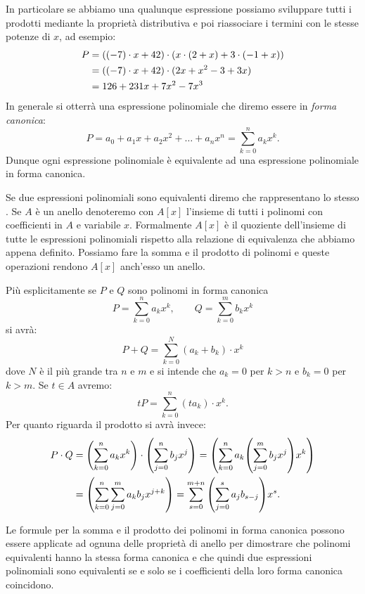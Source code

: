 In particolare se abbiamo una qualunque espressione possiamo sviluppare tutti i prodotti
mediante la proprietà distributiva e poi riassociare i termini 
con le stesse potenze di $x$, ad esempio:
\begin{align*}
P &= {\left( (-7)\cdot x+42 \right)}\cdot(x\cdot (2 + x)
+ 3\cdot(-1+x))\\
&= {\left( (-7)\cdot x + 42 \right)}\cdot (2x+x^2-3+3x) \\
&= 126 + 231 x + 7 x^2 - 7 x^3
\end{align*}
In generale si otterrà una espressione polinomiale che diremo 
essere in \emph{forma canonica}:
\[
  P = a_0 + a_1 x + a_2 x^2 + \dots + a_n x^n
       = \sum_{k=0}^n a_k x^k.
\]
Dunque ogni espressione polinomiale è equivalente ad una 
espressione polinomiale in forma canonica. 

Se due espressioni polinomiali sono equivalenti 
diremo che rappresentano lo stesso .
Se $A$ è un anello denoteremo con 
$A[x]$ \index{$\KK[x]$}%
l'insieme di tutti i polinomi con coefficienti in $A$ e variabile $x$. 
Formalmente $A[x]$ è il quoziente dell'insieme 
di tutte le espressioni polinomiali rispetto alla relazione di equivalenza
che abbiamo appena definito. 
Possiamo fare la somma e il prodotto di polinomi e queste operazioni 
rendono $A[x]$ anch'esso un anello.

Più esplicitamente se $P$ e $Q$ sono polinomi in forma canonica
\[
  P = \sum_{k=0}^n a_k x^k, \qquad Q = \sum_{k=0}^m b_k x^k
\]
si avrà:
\[
  P + Q = \sum_{k=0}^{N} (a_k+b_k) \cdot x^k
\]
dove $N$ è il più grande tra $n$ e $m$ e si intende che $a_k=0$ per $k>n$ e 
$b_k=0$ per $k>m$.
Se $t\in A$ avremo:
\[
  t P = \sum_{k=0}^n (ta_k)\cdot x^k.
\]
Per quanto riguarda il prodotto si avrà invece:
\begin{align*}
  P\cdot Q
  &= {\left( \sum_{k=0}^n a_k x^k \right)}\cdot {\left( \sum_{j=0}^n b_j x^j \right)}
  = {\left( \sum_{k=0}^n a_k {\left( \sum_{j=0}^m b_j x^j \right)} x^k \right)} \\
  &= {\left( \sum_{k=0}^n \sum_{j=0}^m a_k b_j x^{j+k} \right)}
  = \sum_{s=0}^{m+n} {\left( \sum_{j=0}^s a_j b_{s-j} \right)} x^s.
\end{align*}

Le formule per la somma e il prodotto dei polinomi in forma canonica 
possono essere applicate ad ognuna delle proprietà di anello per dimostrare
che polinomi equivalenti hanno la stessa forma canonica e che quindi 
due espressioni polinomiali sono equivalenti se e solo se i coefficienti 
della loro forma canonica coincidono.

